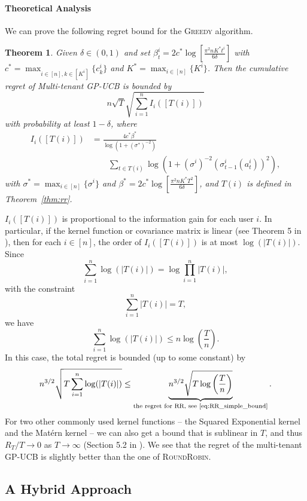 \documentclass[letterpaper]{vldb}
\newcommand{\rr}{\textsc{RoundRobin}\xspace}
\newcommand{\greedy}{\textsc{Greedy}\xspace}
\newtheorem{theorem}{Theorem}
\begin{document}
\paragraph*{Theoretical Analysis} We
can prove the following regret bound
for the \greedy algorithm.

\vspace{-0.5em}
\begin{theorem}
  \label{thm:multi-cost}
  Given $\delta\in (0,1)$ and set $\beta_t^i = 2c^\ast \log\left[ \frac{\pi^2 n K^\ast t^i}{6\delta} \right]$ with $c^\ast = \max_{i\in [n], k\in [K^i]}\{c^i_k\}$ and $K^\ast = \max_{i\in [n]}\{K^i\}$. Then the
  cumulative regret of Multi-tenant GP-UCB is bounded  by
  \[
    n \sqrt{T}\sqrt{\sum_{i=1}^n I_i([T(i)])}
  \]
  with probability at least $1-\delta$,
  where
  \begin{align*}
    I_i([T(i)]) & =  \frac{4c^\ast \beta^\ast}{\log(1 + (\sigma^\ast)^{-2})}\\
    &\qquad \sum_{t\in T(i)} \log\left(1 + (\sigma^i)^{-2}(\sigma^i_{t-1}(a^i_{t}))^2\right),
  \end{align*}
  with $\sigma^\ast= \max_{i\in [n]}\{\sigma^i\}$  and $\beta^\ast = 2c^\ast \log\left[\frac{\pi^2 n K^\ast T^2}{6\delta}\right]$, and $T(i)$ is defined in Theorem~\ref{thm:rr}.
\end{theorem}

$I_i([T(i)])$ is proportional to the information gain for each user $i$. In particular, if the kernel function or covariance matrix is linear (see
  Theorem 5 in \cite{SrinivasKKS10}), then for each $i\in [n]$, the
  order of $I_i([T(i)])$ is at most $\log(|T(i)|)$. Since
  \[
    \sum_{i=1}^n \log(|T(i)|) = \log \prod_{i=1}^n |T(i)|,
    \]
  with the constraint
  \[
    \sum_{i=1}^n|T(i)| = T,
  \]
  we have
  \[
    \sum_{i=1}^n \log(|T(i)|) \le n \log \left(\frac{T}{n}\right).
  \]
  In this case, the total regret is bounded (up to some constant) by
  \[
 n^{3/2}\sqrt{T\sum_{i=1}^n \log(|T(i)|)}  \leq \underbrace{n^{3/2}\sqrt{T \log\left(\frac{T}{n}\right)}}_{\text{the regret for RR, see \eqref{eq:RR_simple_bound}}}.
  \]
For two other commonly used kernel functions -- the Squared Exponential kernel and the Mat\'{e}rn kernel -- we can also get a bound that is sublinear in $T$, and thus $R_T/T \to 0$ as $T\to\infty$ (Section 5.2 in \cite{SrinivasKKS10}). We see that the regret of the multi-tenant GP-UCB is slightly better than the one of \rr. 

\vspace{0.5em}
\subsection{A Hybrid Approach}
\end{document}
